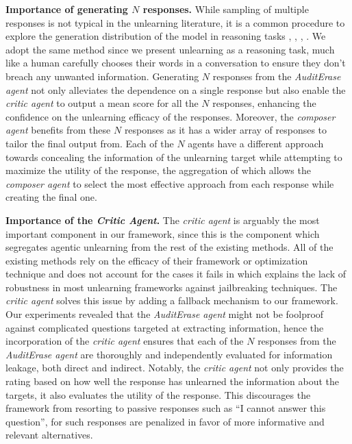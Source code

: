 \textbf{Importance of generating $N$ responses.} While sampling of multiple responses is not typical in the unlearning literature, it is a common procedure to explore the generation distribution of the model in reasoning tasks \cite{wang2023selfconsistencyimproveschainthought}, \cite{qiu2024treebonenhancinginferencetimealignment}, \cite{snell2024scalingllmtesttimecompute}, \cite{lightman2023letsverifystepstep}. We adopt the same method since we present unlearning as a reasoning task, much like a human carefully chooses their words in a conversation to ensure they don't breach any unwanted information. Generating $N$ responses from the \emph{AuditErase agent} not only alleviates the dependence on a single response but also enable the \emph{critic agent} to output a mean score for all the $N$ responses, enhancing the confidence on the unlearning efficacy of the responses. Moreover, the \emph{composer agent} benefits from these $N$ responses as it has a wider array of responses to tailor the final output from. Each of the $N$ agents have a different approach towards concealing the information of the unlearning target while attempting to maximize the utility of the response, the aggregation of which allows the \emph{composer agent} to select the most effective approach from each response while creating the final one.\par

\textbf{Importance of the \emph{Critic Agent}.} The \emph{critic agent} is arguably the most important component in our framework, since this is the component which segregates agentic unlearning from the rest of the existing methods. All of the existing methods rely on the efficacy of their framework or optimization technique and does not account for the cases it fails in which explains the lack of robustness in most unlearning frameworks against jailbreaking techniques. The \emph{critic agent} solves this issue by adding a fallback mechanism to our framework. Our experiments revealed that the \emph{AuditErase agent} might not be foolproof against complicated questions targeted at extracting information, hence the incorporation of the \emph{critic agent} ensures that each of the $N$ responses from the \emph{AuditErase agent} are thoroughly and independently evaluated for information leakage, both direct and indirect. Notably, the \emph{critic agent} not only provides the rating based on how well the response has unlearned the information about the targets, it also evaluates the utility of the response. This discourages the framework from resorting to passive responses such as \enquote{I cannot answer this question}, for such responses are penalized in favor of more informative and relevant alternatives.

